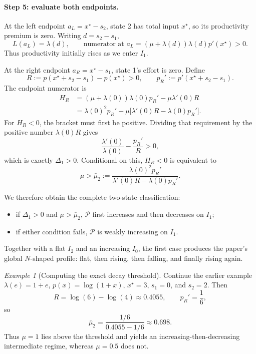 \documentclass[11pt]{article}
\theoremstyle{tutorial}
\theoremstyle{remark}
\newtheorem{example}[theorem]{Example}
\newcommand{\1}{\mathbb{I}}
\newcommand{\calP}{\mathcal{P}}
\begin{document}
\paragraph{Step 5: evaluate both endpoints.}
At the left endpoint $a_L=x^\star-s_2$, state 2 has total input $x^\star$, so its productivity premium is
zero.  Writing $d=s_2-s_1$,
\[
  L(a_L)=\lambda(d),
  \qquad
  \text{numerator at }a_L=(\mu+\lambda(d))\lambda(d)p'(x^\star)>0.
\]
Thus productivity initially rises as we enter $I_1$.

At the right endpoint $a_R=x^\star-s_1$, state 1's effort is zero.  Define
\[
  R:=p(x^\star+s_2-s_1)-p(x^\star)>0,
  \qquad
  p_R':=p'(x^\star+s_2-s_1).
\]
The endpoint numerator is
\begin{align*}
H_R
&=(\mu+\lambda(0))\lambda(0)p_R'-\mu\lambda'(0)R\\
&=\lambda(0)^2p_R'
-\mu\bigl[\lambda'(0)R-\lambda(0)p_R'\bigr].
\end{align*}
For $H_R<0$, the bracket must first be positive.  Dividing that requirement by the positive number
$\lambda(0)R$ gives
\[
  \frac{\lambda'(0)}{\lambda(0)}-\frac{p_R'}{R}>0,
\]
which is exactly $\Delta_1>0$.  Conditional on this, $H_R<0$ is equivalent to
\begin{equation}
\mu>
\bar\mu_2:=
\frac{\lambda(0)^2p_R'}
{\lambda'(0)R-\lambda(0)p_R'}.
\label{eq:two-state-mu-threshold}
\end{equation}

We therefore obtain the complete two-state classification:
\begin{itemize}
  \item if $\Delta_1>0$ and $\mu>\bar\mu_2$, $\calP$ first increases and then decreases on $I_1$;
  \item if either condition fails, $\calP$ is weakly increasing on $I_1$.
\end{itemize}
Together with a flat $I_2$ and an increasing $I_0$, the first case produces the paper's global
$N$-shaped profile: flat, then rising, then falling, and finally rising again.

\begin{example}[Computing the exact decay threshold]
Continue the earlier example $\lambda(e)=1+e$, $p(x)=\log(1+x)$, $x^\star=3$, $s_1=0$, and $s_2=2$.
Then
\[
R=\log(6)-\log(4)\approx0.4055,
\qquad p_R'=\frac16,
\]
so
\[
\bar\mu_2
=\frac{1/6}{0.4055-1/6}
\approx0.698.
\]
Thus $\mu=1$ lies above the threshold and yields an increasing-then-decreasing intermediate regime,
whereas $\mu=0.5$ does not.
\end{example}
\end{document}

